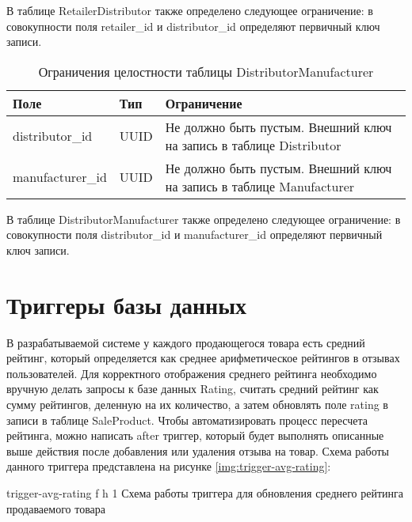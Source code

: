 В таблице RetailerDistributor также определено следующее ограничение: в совокупности поля retailer\_id и distributor\_id определяют первичный ключ записи.


\begin{table}[!h]
	\begin{center}
		\begin{threeparttable}
			\caption{Ограничения целостности таблицы DistributorManufacturer}
			\label{tbl:entity_distributor_manufacturer}
			\begin{tabular}{|p{4.5cm}|p{2.5cm}|p{8.5cm}|}
				\hline 
				\textbf{Поле} & \textbf{Тип} & \textbf{Ограничение}  \\
				\hline
				distributor\_id & UUID & Не должно быть пустым. Внешний ключ на запись в таблице Distributor \\
				\hline
				manufacturer\_id & UUID & Не должно быть пустым. Внешний ключ на запись в таблице Manufacturer  \\
				\hline
			\end{tabular}
		\end{threeparttable}			
	\end{center}
\end{table}

\clearpage 

В таблице DistributorManufacturer также определено следующее ограничение: в совокупности поля distributor\_id и manufacturer\_id определяют первичный ключ записи.

\section{Триггеры базы данных}

В разрабатываемой системе у каждого продающегося товара есть средний рейтинг, который определяется как среднее арифметическое рейтингов в отзывах пользователей. Для корректного отображения среднего рейтинга необходимо вручную делать запросы к базе данных Rating, считать средний рейтинг как сумму рейтингов, деленную на их количество, а затем обновлять поле rating в записи в таблице SaleProduct. Чтобы автоматизировать процесс пересчета рейтинга, можно написать after триггер, который будет выполнять описанные выше действия после добавления или удаления отзыва на товар. Схема работы данного триггера представлена на рисунке \ref{img:trigger-avg-rating}: 

{trigger-avg-rating} %
{f} %
{h} %
{1\textwidth} %
{Схема работы триггера для обновления среднего рейтинга продаваемого товара} %

